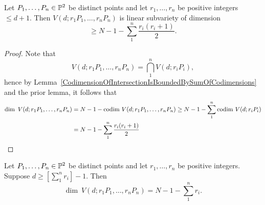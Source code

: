     \begin{lemma}\label{LowerBoundForLinearSystemsThroughPointsOfDiffMultiplicities}
        Let $P_1,\dots, P_n\in \mathbb{P}^2$ be distinct points and let $r_1,\dots,r_n$ be positive integers $\leq d+1$. Then $V(d; r_1P_1,\dots,r_nP_n)$ is linear subvariety of dimension 
        $$\geq N-1 -\sum_1^n \frac{r_i(r_i+1)}{2}.$$
    \end{lemma}
    \begin{proof}
        Note that 
        $$V(d; r_1P_1,\dots,r_nP_n)= \bigcap_1^n V(d;r_iP_i),$$
        hence by Lemma~\ref{CodimensionOfIntersectionIsBoundedBySumOfCodimensions} and the prior lemma, it follows that 
        \begin{align*} 
            \dim \ V(d;r_1P_1,\dots,r_nP_n) &= N-1-\codim\ V(d;r_1P_1,\dots,r_nP_n) \geq N-1-\sum_1^n \codim\ V(d;r_iP_i)\\
            &= N-1-\sum_1^n \frac{r_i(r_i+1)}{2} 
        \end{align*}
    \end{proof}
    \begin{theorem}\label{DimensionOfLinearSubvarietiesOfCurvesOfLargeDegree}
        Let $P_1,\dots, P_n\in \mathbb{P}^2$ be distinct points and let $r_1,\dots,r_n$ be positive integers. Suppose $d\geq \left[\sum_1^n r_i\right] - 1$. Then 
        $$\dim \ V(d; r_1P_1,\dots,r_nP_n) = N-1-\sum_1^n r_i.$$
    \end{theorem}
